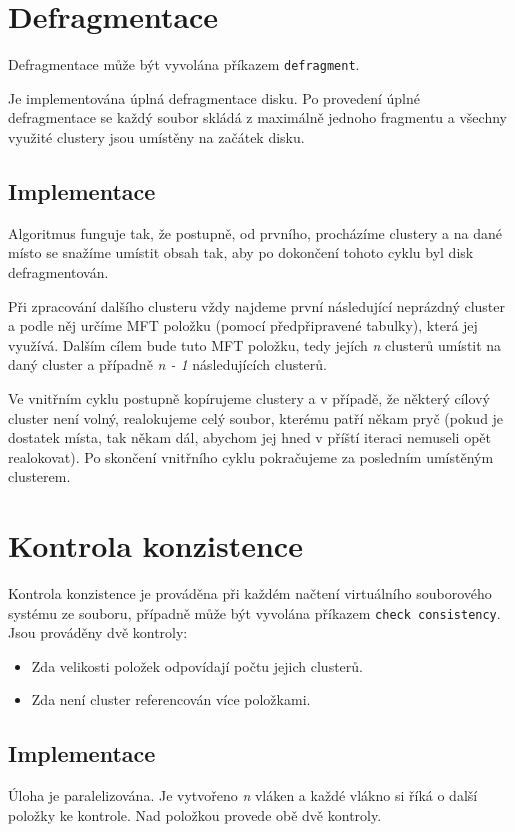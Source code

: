 \documentclass[12pt, a4paper]{report}
\begin{document}
\section{Defragmentace}
Defragmentace může být vyvolána příkazem \verb|defragment|. 

Je implementována úplná defragmentace disku. Po provedení úplné defragmentace se každý soubor skládá z maximálně jednoho fragmentu a všechny využité clustery jsou umístěny na začátek disku.

\subsection*{Implementace}
Algoritmus funguje tak, že postupně, od prvního, procházíme clustery a na dané místo se snažíme umístit obsah tak, aby po dokončení tohoto cyklu byl disk defragmentován.

Při zpracování dalšího clusteru vždy najdeme první následující neprázdný cluster a podle něj určíme MFT položku (pomocí předpřipravené tabulky), která jej využívá. Dalším cílem bude tuto MFT položku, tedy jejích \emph{n} clusterů umístit na daný cluster a případně \emph{n - 1} následujících clusterů.

Ve vnitřním cyklu postupně kopírujeme clustery a v případě, že některý cílový cluster není volný, realokujeme celý soubor, kterému patří někam pryč (pokud je dostatek místa, tak někam dál, abychom jej hned v příští iteraci nemuseli opět realokovat). Po skončení vnitřního cyklu pokračujeme za posledním umístěným clusterem.

\section{Kontrola konzistence}
Kontrola konzistence je prováděna při každém načtení virtuálního souborového systému ze souboru, případně může být vyvolána příkazem \verb|check consistency|.\\

\noindent
Jsou prováděny dvě kontroly:
\begin{itemize}
	\item Zda velikosti položek odpovídají počtu jejich clusterů.
	\item Zda není cluster referencován více položkami.
\end{itemize}

\subsection*{Implementace}
Úloha je paralelizována. Je vytvořeno \emph{n} vláken a každé vlákno si říká o další položky ke kontrole. Nad položkou provede obě dvě kontroly.\\
\end{document}
